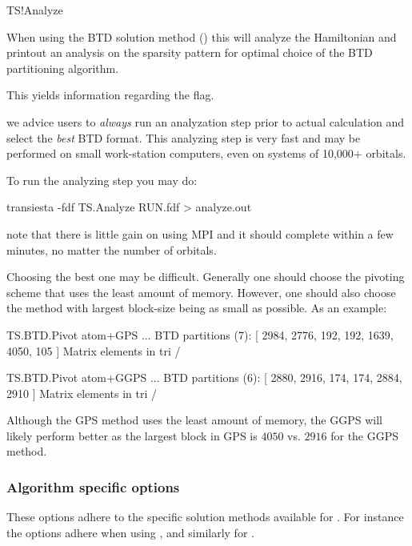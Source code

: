 \begin{fdflogicalF}{TS!Analyze}

  When using the BTD solution method () this
  will analyze the Hamiltonian and printout an analysis on the
  sparsity pattern for optimal choice of the BTD partitioning
  algorithm. 

  This yields information regarding the  flag.

  \note we advice users to \emph{always} run an analyzation step prior
  to actual calculation and select the \emph{best} BTD
  format. This analyzing step is very fast and may be performed on
  small work-station computers, even on systems of 10,000$+$ orbitals.  

  To run the analyzing step you may do:
  \begin{shellexample}
    transiesta -fdf TS.Analyze RUN.fdf > analyze.out
  \end{shellexample}
  note that there is little gain on using MPI and it should complete
  within a few minutes, no matter the number of orbitals.

  Choosing the best one may be difficult. Generally one should
  choose the pivoting scheme that uses the least amount of
  memory. However, one should also choose the method with largest
  block-size being as small as possible. As an example:
  \begin{shellexample}
TS.BTD.Pivot atom+GPS
...
    BTD partitions (7): 
     [ 2984, 2776, 192, 192, 1639, 4050, 105 ]
    Matrix elements in tri / %

TS.BTD.Pivot atom+GGPS
...
    BTD partitions (6): 
     [ 2880, 2916, 174, 174, 2884, 2910 ]
    Matrix elements in tri / %

  \end{shellexample}
  Although the GPS method uses the least amount of memory, the GGPS
  will likely perform better as the largest block in GPS is $4050$
  vs. $2916$ for the GGPS method. 

\end{fdflogicalF}


\subsubsection{Algorithm specific options}

These options adhere to the specific solution methods available for
\tsiesta. For instance the  options adhere when using
 , and similarly for .

